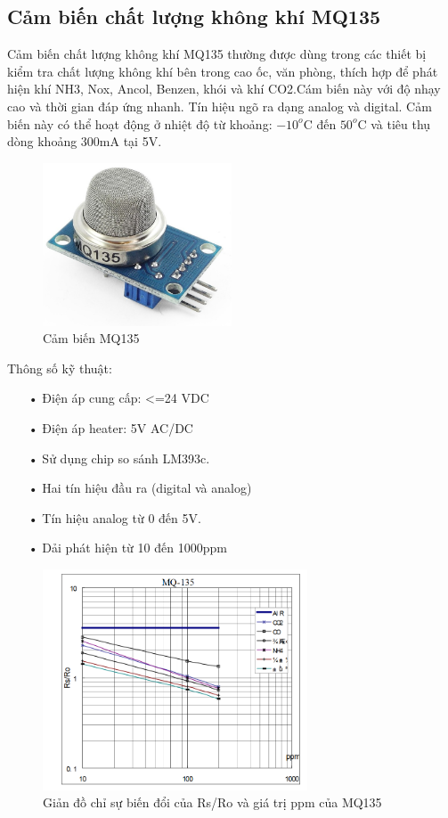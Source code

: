 \subsection*{Cảm biến chất lượng không khí MQ135} 
Cảm biến chất lượng không khí MQ135 thường được dùng trong các thiết bị kiểm tra chất lượng không khí bên trong cao ốc, văn phòng, thích hợp để phát hiện khí NH3, Nox, Ancol, Benzen, khói và khí CO2.Cám biến này với độ nhạy cao và thời gian đáp ứng nhanh. Tín hiệu ngõ ra dạng analog và digital. Cảm biến này có thể hoạt động ở nhiệt độ từ khoảng: $-10^{o}$C đến $50^{o}$C và tiêu thụ dòng khoảng 300mA tại 5V.
\begin{figure}[H]
	\centering    
	\includegraphics[width=0.5\textwidth]{mq135}
	\caption[Cảm biến MQ135]{Cảm biến MQ135}
	\label{fig:mq135}
\end{figure}
Thông số kỹ thuật:
\begin{itemize}
\item[•]Điện áp cung cấp: <=24 VDC
\item[•]Điện áp heater: 5V AC/DC
\item[•]Sử dụng chip so sánh LM393c.
\item[•]Hai tín hiệu đầu ra (digital và analog)
\item[•]Tín hiệu analog từ 0 đến 5V.
\item[•]Dải phát hiện từ 10 đến 1000ppm
\end{itemize}

\begin{figure}[H]
	\centering    
	\includegraphics[width=0.7\textwidth]{mq135_mqh1}
	\caption[Giản đồ chỉ sự biến đổi của Rs/Ro và giá trị ppm của MQ135]{Giản đồ chỉ sự biến đổi của Rs/Ro và giá trị ppm của MQ135}
	\label{fig:mq135_mqh1}
\end{figure}

